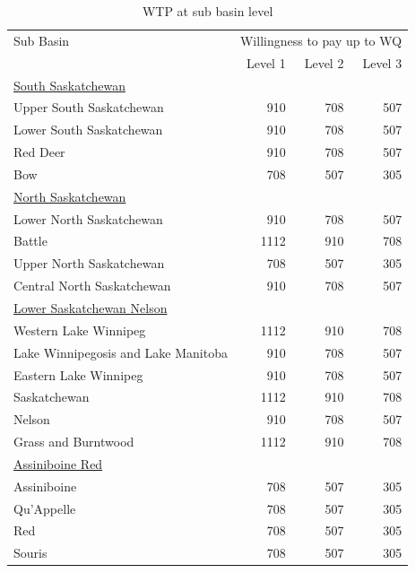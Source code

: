 \begin{table}[H]
\singlespacing
\centering
\caption{WTP at sub basin level} 
\begin{tabular}{lrrr}
  \hline
Sub Basin & \multicolumn{3}{c}{Willingness to pay up to WQ}\\ 
 & Level 1 & Level 2 & Level 3 \\ 
  \hline
\underline{South Saskatchewan} & & &  \\ 
Upper South Saskatchewan & 910 & 708 & 507 \\ 
Lower South Saskatchewan & 910 & 708 & 507 \\ 
Red Deer & 910 & 708 & 507 \\ 
Bow & 708 & 507 & 305 \\ 

\underline{North Saskatchewan} & & &  \\ 
Lower North Saskatchewan & 910 & 708 & 507\\ 
Battle & 1112 & 910 & 708 \\ 
Upper North Saskatchewan & 708 & 507 & 305 \\ 
Central North Saskatchewan & 910 & 708 & 507 \\ 

\underline{Lower Saskatchewan Nelson} & & &  \\ 
Western Lake Winnipeg & 1112 & 910 & 708 \\ 
Lake Winnipegosis and Lake Manitoba & 910 & 708 & 507 \\ 
Eastern Lake Winnipeg & 910 & 708 & 507 \\ 
Saskatchewan & 1112 & 910 & 708 \\ 
Nelson & 910 & 708 & 507 \\ 
Grass and Burntwood & 1112 & 910 & 708 \\ 

\underline{Assiniboine Red} & & &  \\ 
Assiniboine & 708 & 507 & 305 \\ 
Qu'Appelle & 708 & 507 & 305 \\ 
Red & 708 & 507 & 305 \\ 
Souris & 708 & 507 & 305 \\ 
   \hline
\end{tabular}

\end{table}
